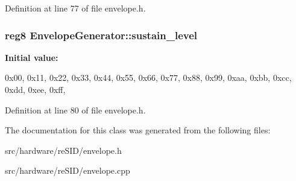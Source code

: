 Definition at line 77 of file envelope.\-h.

\hypertarget{classEnvelopeGenerator_abdb40ef8874340921d6c6fa034aa1f2c}{
\subsubsection[{sustain\-\_\-level}]{\setlength{\rightskip}{0pt plus 5cm}reg8 Envelope\-Generator\-::sustain\-\_\-level}}\label{classEnvelopeGenerator_abdb40ef8874340921d6c6fa034aa1f2c}
{\bfseries Initial value\-:}
\begin{DoxyCode}
 {
  0x00,
  0x11,
  0x22,
  0x33,
  0x44,
  0x55,
  0x66,
  0x77,
  0x88,
  0x99,
  0xaa,
  0xbb,
  0xcc,
  0xdd,
  0xee,
  0xff,
}
\end{DoxyCode}


Definition at line 80 of file envelope.\-h.



The documentation for this class was generated from the following files\-:\begin{DoxyCompactItemize}
\item 
src/hardware/re\-S\-I\-D/envelope.\-h\item 
src/hardware/re\-S\-I\-D/envelope.\-cpp\end{DoxyCompactItemize}
